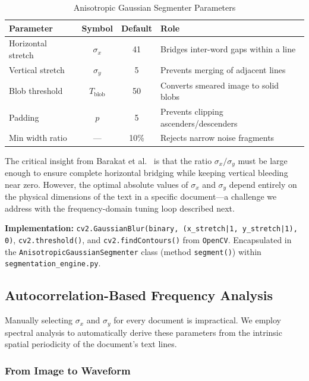 \documentclass[12pt, a4paper]{article}
\begin{document}
\begin{table}[H]
\centering
\caption{Anisotropic Gaussian Segmenter Parameters}
\label{tab:seg_params}
\begin{tabular}{@{}lccp{5.5cm}@{}}
\toprule
\textbf{Parameter} & \textbf{Symbol} & \textbf{Default} & \textbf{Role} \\
\midrule
Horizontal stretch & $\sigma_x$ & 41 & Bridges inter-word gaps within a line \\
Vertical stretch & $\sigma_y$ & 5 & Prevents merging of adjacent lines \\
Blob threshold & $T_{\text{blob}}$ & 50 & Converts smeared image to solid blobs \\
Padding & $p$ & 5 & Prevents clipping ascenders/descenders \\
Min width ratio & --- & 10\% & Rejects narrow noise fragments \\
\bottomrule
\end{tabular}
\end{table}

The critical insight from Barakat et al.~\cite{barakat2020} is that the ratio $\sigma_x / \sigma_y$ must be large enough to ensure complete horizontal bridging while keeping vertical bleeding near zero. However, the optimal absolute values of $\sigma_x$ and $\sigma_y$ depend entirely on the physical dimensions of the text in a specific document---a challenge we address with the frequency-domain tuning loop described next.

\textbf{Implementation:} \texttt{cv2.GaussianBlur(binary, (x\_stretch|1, y\_stretch|1), 0)}, \texttt{cv2.threshold()}, and \texttt{cv2.findContours()} from \texttt{OpenCV}. Encapsulated in the \texttt{AnisotropicGaussianSegmenter} class (method \texttt{segment()}) within \texttt{segmentation\_engine.py}.


\subsection{Autocorrelation-Based Frequency Analysis}

Manually selecting $\sigma_x$ and $\sigma_y$ for every document is impractical. We employ spectral analysis to automatically derive these parameters from the intrinsic spatial periodicity of the document's text lines.

\subsubsection{From Image to Waveform}
\end{document}
